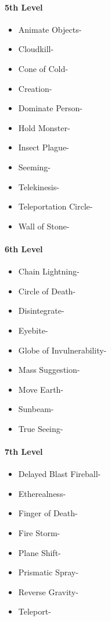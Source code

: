 \documentclass[
]{article}
\providecommand{\tightlist}{%
  \setlength{\itemsep}{0pt}\setlength{\parskip}{0pt}}
\begin{document}
\hypertarget{5th-level-5}{%
\paragraph{5th Level}\label{5th-level-5}}

\begin{itemize}
\tightlist
\item
  Animate Objects-
\item
  Cloudkill-
\item
  Cone of Cold-
\item
  Creation-
\item
  Dominate Person-
\item
  Hold Monster-
\item
  Insect Plague-
\item
  Seeming-
\item
  Telekinesis-
\item
  Teleportation Circle-
\item
  Wall of Stone-
\end{itemize}

\hypertarget{6th-level-3}{%
\paragraph{6th Level}\label{6th-level-3}}

\begin{itemize}
\tightlist
\item
  Chain Lightning-
\item
  Circle of Death-
\item
  Disintegrate-
\item
  Eyebite-
\item
  Globe of Invulnerability-
\item
  Mass Suggestion-
\item
  Move Earth-
\item
  Sunbeam-
\item
  True Seeing-
\end{itemize}

\hypertarget{7th-level-3}{%
\paragraph{7th Level}\label{7th-level-3}}

\begin{itemize}
\tightlist
\item
  Delayed Blast Fireball-
\item
  Etherealness-
\item
  Finger of Death-
\item
  Fire Storm-
\item
  Plane Shift-
\item
  Prismatic Spray-
\item
  Reverse Gravity-
\item
  Teleport-
\end{itemize}
\end{document}
